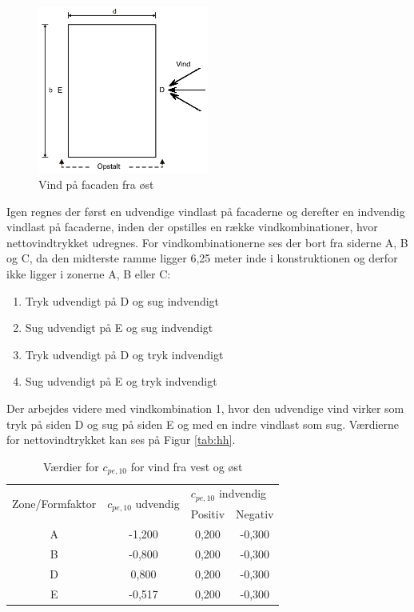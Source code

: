 \begin{figure}[htbp]
	\centering
	\includegraphics[width=0.5\textwidth]{billeder/vindost1.png}
	\caption{Vind på facaden fra øst \citep[ 7.2.2]{EU91}}
	\label{fig:vindost}
\end{figure}

Igen regnes der først en udvendige vindlast på facaderne og derefter en indvendig vindlast på facaderne, inden der opstilles en række vindkombinationer, hvor nettovindtrykket udregnes. For vindkombinationerne ses der bort fra siderne A, B og C, da den midterste ramme ligger 6,25 meter inde i konstruktionen og derfor ikke ligger i zonerne A, B eller C:
\begin{enumerate}
	\item Tryk udvendigt på D og sug indvendigt
	\item Sug udvendigt på E og sug indvendigt
	\item Tryk udvendigt på D og tryk indvendigt  
	\item Sug udvendigt på E og tryk indvendigt
\end{enumerate}

Der arbejdes videre med vindkombination 1, hvor den udvendige vind virker som tryk på siden D og sug på siden E og med en indre vindlast som sug.
\newline \indent{     }  Værdierne for nettovindtrykket kan ses på Figur \ref{tab:hh}.

\begin{table}[htb]
	\begin{center}
		\begin{tabular}{ |c|c|c|c| } 
			\hline
			\multirow{2}{*}{Zone/Formfaktor} & \multirow{2}{*}{$c_{pe,10}$ udvendig} & \multicolumn{2}{l|}{$c_{pe,10}$ indvendig} \\ \cline{3-4} 
			& & Positiv & Negativ   		\\ \hline
			A & -1,200 & 0,200 & -0,300 \\	\hline
			B & -0,800 & 0,200 & -0,300 \\	\hline 
			D & 0,800 & 0,200 & -0,300 \\	\hline
			E & -0,517 & 0,200 & -0,300 \\	\hline
		\end{tabular}
		\caption{Værdier for $c_{pe,10}$ for vind fra vest og øst}
		\label{tab:ff}
	\end{center}
\end{table}


